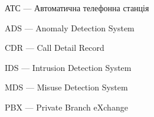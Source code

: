 \newpage
{}
\begin{ESKDexplanation}
  \item АТС --- Автоматична телефонна станція
  \item ADS --- Anomaly Detection System
  \item CDR --- Call Detail Record
  \item IDS --- Intrusion Detection System
  \item MDS --- Misuse Detection System
  \item PBX --- Private Branch eXchange
\end{ESKDexplanation}
